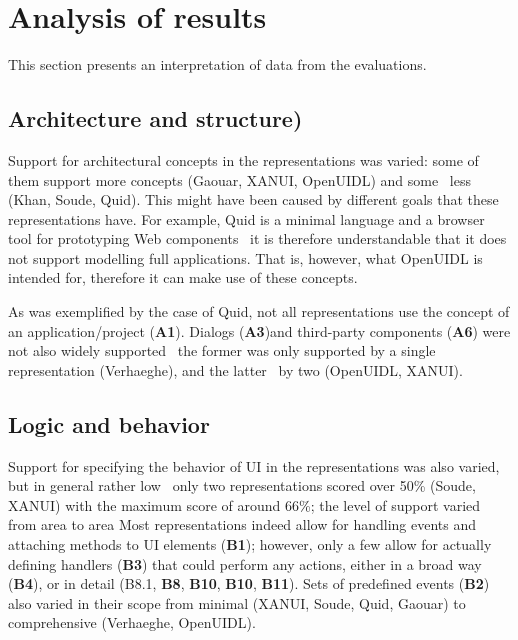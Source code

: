 \section{Analysis of results}\label{sec:analysis-of-results}
This section presents an interpretation of data from the evaluations.


\subsection{Architecture and structure)}\label{subsec:4-2-architecture-and-structure}
Support for architectural concepts in the representations was varied: some of them support more concepts (Gaouar, XANUI, OpenUIDL) and some \textendash\ less (Khan, Soude, Quid).
This might have been caused by different goals that these representations have.
For example, Quid is a minimal language and a browser tool for prototyping Web components \textendash\ it is therefore understandable that it does not support modelling full applications.
That is, however, what OpenUIDL is intended for, therefore it can make use of these concepts.

As was exemplified by the case of Quid, not all representations use the concept of an application/project (\textbf{A1}).
Dialogs (\textbf{A3})and third-party components (\textbf{A6}) were not also widely supported \textendash\ the former was only supported by a single representation (Verhaeghe), and the latter \textendash\ by two (OpenUIDL, XANUI).

\subsection{Logic and behavior}\label{subsec:4-2-logic-and-behavior}
Support for specifying the behavior of UI in the representations was also varied, but in general rather low \textendash\ only two representations scored over 50\% (Soude, XANUI) with the maximum score of around 66\%;
the level of support varied from area to area
Most representations indeed allow for handling events and attaching methods to UI elements (\textbf{B1});
however, only a few allow for actually defining handlers (\textbf{B3}) that could perform any actions, either in a broad way (\textbf{B4}), or in detail (B8.1, \textbf{B8}, \textbf{B10}, \textbf{B10}, \textbf{B11}).
Sets of predefined events (\textbf{B2}) also varied in their scope from minimal (XANUI, Soude, Quid, Gaouar) to comprehensive (Verhaeghe, OpenUIDL).

